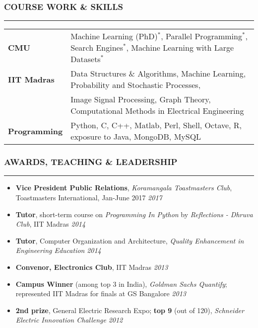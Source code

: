 \documentclass[10pt,a4paper,English]{article}
\newcommand\roottitle[1]{\vspace{-4mm}\subsubsection*{\uppercase{#1}}\vspace{-0.3em}\nopagebreak[4]\hrule\vspace{4mm}}
\newcommand\itemyear[1]{\hfill \emph{\color{itemyear} #1}}
\newcommand\itemenv{\setlength\itemsep{0.5pt} \addtolength{\itemindent}{-5mm}\vspace{-1.5mm}}
\begin{document}
\roottitle{Course Work \& Skills}
\vspace{-2mm}
\renewcommand{\arraystretch}{1.2}
\setlength\tabcolsep{0pt}
\begin{tabularx}{\textwidth}{ l @{ - } X }
\textbf{CMU}                        & Machine Learning (PhD)$^*$, Parallel Programming$^*$, Search Engines$^*$, Machine Learning with Large Datasets$^*$ \\
\textbf{IIT Madras}                 & Data Structures \& Algorithms, Machine Learning, Probability and Stochastic Processes, \\
                                    & Image Signal Processing, Graph Theory, Computational Methods in Electrical Engineering \\
\textbf{Programming}                & Python, C, C++, Matlab, Perl, Shell, Octave, R, exposure to Java, MongoDB, MySQL
\end{tabularx}
\vspace{2mm}

\roottitle{Awards, Teaching \& Leadership}
\begin{itemize} \itemenv
    \item \textbf{Vice President Public Relations}, \textit{Koramangala Toastmasters Club}, Toastmasters International, Jan-June 2017 \itemyear{2017}
    \item \textbf{Tutor}, short-term course on \textit{Programming In Python} by \emph{Reflections - Dhruva Club}, IIT Madras \itemyear{2014}
    \item \textbf{Tutor}, Computer Organization and Architecture, \emph{Quality Enhancement in Engineering Education} \itemyear{2014}
    \item \textbf{Convenor, Electronics Club}, IIT Madras \itemyear{2013}
    \item \textbf{Campus Winner} (among top {3} in India), \textit{Goldman Sachs Quantify}; represented IIT Madras for finals at GS Bangalore \itemyear{2013}
    \item \textbf{2nd prize}, General Electric Research Expo; \textbf{top 9} (out of 120), \textit{Schneider Electric Innovation Challenge} \itemyear{2012}
\end{itemize}
\vspace{1mm}

\noindent {}
\end{document}
